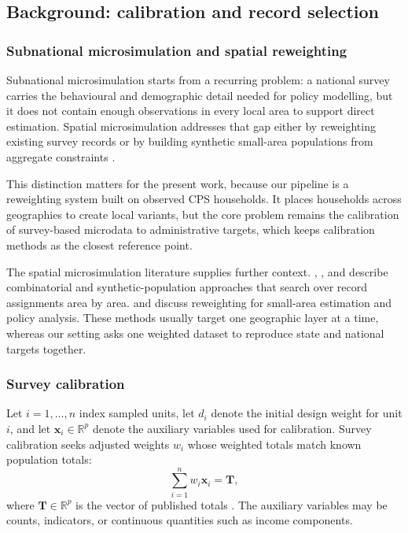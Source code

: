 \subsection{Background: calibration and record selection}
\label{sp:sec:background}

\subsubsection{Subnational microsimulation and spatial reweighting}

Subnational microsimulation starts from a recurring problem: a national survey carries the
behavioural and demographic detail needed for policy modelling, but it does not contain enough
observations in every local area to support direct estimation. Spatial microsimulation addresses
that gap either by reweighting existing survey records or by building synthetic small-area
populations from aggregate constraints \citep{tanton2014review, odonoghue2014review}.

This distinction matters for the present work, because our pipeline is a reweighting system built on
observed CPS households. It places households across geographies to create local variants, but the
core problem remains the calibration of survey-based microdata to administrative targets, which keeps
calibration methods as the closest reference point.

The spatial microsimulation literature supplies further context. \citet{williamson1998},
\citet{huang2001}, and \citet{harland2012} describe combinatorial and synthetic-population
approaches that search over record assignments area by area. \citet{tanton2011} and
\citet{lovelace2016} discuss reweighting for small-area estimation and policy analysis. These
methods usually target one geographic layer at a time, whereas our setting asks one weighted dataset
to reproduce state and national targets together.

\subsubsection{Survey calibration}

Let $i = 1, \ldots, n$ index sampled units, let $d_i$ denote the initial design weight for unit $i$,
and let $\mathbf{x}_i \in \mathbb{R}^p$ denote the auxiliary variables used for calibration. Survey
calibration seeks adjusted weights $w_i$ whose weighted totals match known population totals:
\begin{equation}
    \sum_{i=1}^{n} w_i \mathbf{x}_i = \mathbf{T},
    \label{sp:eq:calibration_constraint}
\end{equation}
where $\mathbf{T} \in \mathbb{R}^p$ is the vector of published totals \citep{deville1992,
sarndal2007}. The auxiliary variables may be counts, indicators, or continuous quantities such as
income components.

